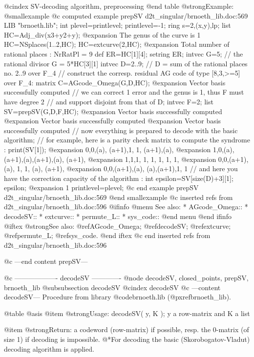 @cindex SV-decoding algorithm, preprocessing
@end table
@strong{Example:}
@smallexample
@c computed example prepSV d2t_singular/brnoeth_lib.doc:569 
LIB "brnoeth.lib";
int plevel=printlevel;
printlevel=-1;
ring s=2,(x,y),lp;
list HC=Adj_div(x3+y2+y);
@expansion{} The genus of the curve is 1
HC=NSplaces(1..2,HC);
HC=extcurve(2,HC);
@expansion{} Total number of rational places : NrRatPl = 9
def ER=HC[1][4];
setring ER;
intvec G=5;      // the rational divisor G = 5*HC[3][1]
intvec D=2..9;   // D = sum of the rational places no. 2..9 over F_4
// construct the corresp. residual AG code of type [8,3,>=5] over F_4:
matrix C=AGcode_Omega(G,D,HC);
@expansion{} Vector basis successfully computed 
// we can correct 1 error and the genus is 1, thus F must have degree 2
// and support disjoint from that of D;
intvec F=2;
list SV=prepSV(G,D,F,HC);
@expansion{} Vector basis successfully computed 
@expansion{} Vector basis successfully computed 
@expansion{} Vector basis successfully computed 
// now everything is prepared to decode with the basic algorithm;
// for example, here is a parity check matrix to compute the syndrome :
print(SV[1]);
@expansion{} 0,0,(a),  (a+1),1,  1,    (a+1),(a),  
@expansion{} 1,0,(a),  (a+1),(a),(a+1),(a),  (a+1),
@expansion{} 1,1,1,    1,    1,  1,    1,    1,    
@expansion{} 0,0,(a+1),(a),  1,  1,    (a),  (a+1),
@expansion{} 0,0,(a+1),(a),  (a),(a+1),1,    1     
// and here you have the correction capacity of the algorithm :
int epsilon=SV[size(D)+3][1];
epsilon;
@expansion{} 1
printlevel=plevel;
@c end example prepSV d2t_singular/brnoeth_lib.doc:569
@end smallexample
@c inserted refs from d2t_singular/brnoeth_lib.doc:596
@ifinfo
@menu
See also:
* AGcode_Omega::
* decodeSV::
* extcurve::
* permute_L::
* sys_code::
@end menu
@end ifinfo
@iftex
@strong{See also:}
@ref{AGcode_Omega};
@ref{decodeSV};
@ref{extcurve};
@ref{permute_L};
@ref{sys_code}.
@end iftex
@c end inserted refs from d2t_singular/brnoeth_lib.doc:596

@c ---end content prepSV---

@c ------------------- decodeSV -------------
@node decodeSV, closed_points, prepSV, brnoeth_lib
@subsubsection decodeSV
@cindex decodeSV
@c ---content decodeSV---
Procedure from library @code{brnoeth.lib} (@pxref{brnoeth_lib}).

@table @asis
@item @strong{Usage:}
decodeSV( y, K ); y a row-matrix and K a list

@item @strong{Return:}
a codeword (row-matrix) if possible, resp. the 0-matrix (of size
1) if decoding is impossible.
@*For decoding the basic (Skorobogatov-Vladut) decoding algorithm
is applied.

